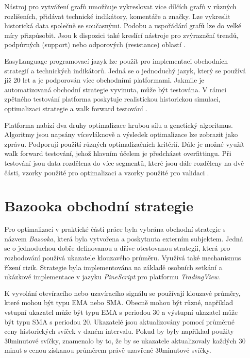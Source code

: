 Nástroj pro vytváření grafů umožňuje vykreslovat více dílčích grafů v různých rozlišeních, přidávat technické indikátory, komentáře a značky.
Lze vykreslit historická data společně se současnými.
Podobu a uspořádání grafů lze do velké míry přizpůsobit.
Jsou k dispozici také kreslící nástroje pro zvýraznění trendů, podpůrných (support) nebo odporových (resistance) oblastí \cite{multicharts}.

EasyLanguage programovací jazyk lze použít pro implementaci obchodních strategií a technických indikátorů.
Jedná se o jednoduchý jazyk, který se používá již 20 let a je podporován více obchodními platformami.
Jakmile je automatizovaná obchodní strategie vyvinuta, může být testována.
V rámci zpětného testování platforma poskytuje realistickou historickou simulaci, optimalizaci strategie a walk forward testování \cite{multicharts}.

Platforma nabízí dva druhy optimalizace hrubou sílu a genetický algoritmus.
Algoritmy jsou napsány vícevláknově a výsledek optimalizace lze zobrazit jako zprávu.
Podporují použití různých optimalizačních kritérií.
Dále je možné využít walk forward testování, jehož hlavním účelem je předcházet overfittingu.
Při testování jsou data rozdělena do více segmentů, které jsou dále rozděleny na dvě části, vzorky použité pro optimalizaci a vzorky použité pro validaci \cite{multicharts}.

\section{Bazooka obchodní strategie}
Pro optimalizaci v praktické části práce byla vybrána obchodní strategie s názvem \textit{Bazooka}, která byla vytvořena a poskytnuta externím subjektem.
Jedná se o jednoduchou dobře definovanou a dříve otestovanou strategii, která pro rozhodování používá ukazatele klouzavého průměru.
Využívá také mechanismus řízení rizik.
Strategie byla implementována na základě osobních setkání a ukázkové implementace v jazyku \textit{PineScript} pro platformu \textit{TradingView}.

K vyvolání otevíracího nebo uzavíracího signálu se používají klouzavé průměry, které mohou být typu EMA nebo SMA.
Obecně mohou být různé, například vstupní ukazatel může být typu EMA s periodou 30 a výstupní ukazatel může být typu SMA s periodou 20.
Ukazatelé jsou aktualizovány pomocí průměrné ceny historických svíček v daném intervalu.
Pokud by byly například použity 30minutové svíčky, znamenalo by to, že by se ukazatele aktualizovaly každých 30 minut s cenou získanou průměrem právě uzavřené 30minutové svíčky.

